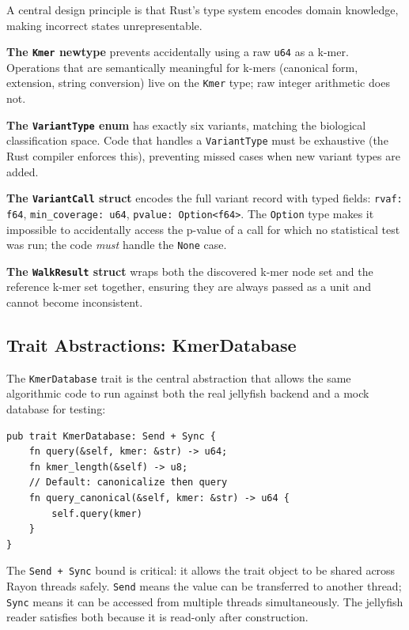 A central design principle is that Rust's type system encodes domain knowledge,
making incorrect states unrepresentable.

\textbf{The \texttt{Kmer} newtype} prevents accidentally using a raw \texttt{u64}
as a k-mer.  Operations that are semantically meaningful for k-mers (canonical
form, extension, string conversion) live on the \texttt{Kmer} type; raw integer
arithmetic does not.

\textbf{The \texttt{VariantType} enum} has exactly six variants, matching the
biological classification space.  Code that handles a \texttt{VariantType} must
be exhaustive (the Rust compiler enforces this), preventing missed cases when
new variant types are added.

\textbf{The \texttt{VariantCall} struct} encodes the full variant record with
typed fields: \texttt{rvaf: f64}, \texttt{min\_coverage: u64},
\texttt{pvalue: Option<f64>}.  The \texttt{Option} type makes it impossible
to accidentally access the p-value of a call for which no statistical test was
run; the code \emph{must} handle the \texttt{None} case.

\textbf{The \texttt{WalkResult} struct} wraps both the discovered k-mer node set
and the reference k-mer set together, ensuring they are always passed as a unit
and cannot become inconsistent.

\subsection{Trait Abstractions: KmerDatabase}
\label{sec:trait-abstractions}

The \texttt{KmerDatabase} trait is the central abstraction that allows the same
algorithmic code to run against both the real jellyfish backend and a mock
database for testing:

\begin{lstlisting}[style=rust,
  caption={The KmerDatabase trait (src/jellyfish/mod.rs).}]
pub trait KmerDatabase: Send + Sync {
    fn query(&self, kmer: &str) -> u64;
    fn kmer_length(&self) -> u8;
    // Default: canonicalize then query
    fn query_canonical(&self, kmer: &str) -> u64 {
        self.query(kmer)
    }
}
\end{lstlisting}

The \texttt{Send + Sync} bound is critical: it allows the trait object to be
shared across Rayon threads safely.  \texttt{Send} means the value can be
transferred to another thread; \texttt{Sync} means it can be accessed from
multiple threads simultaneously.  The jellyfish reader satisfies both because
it is read-only after construction.

